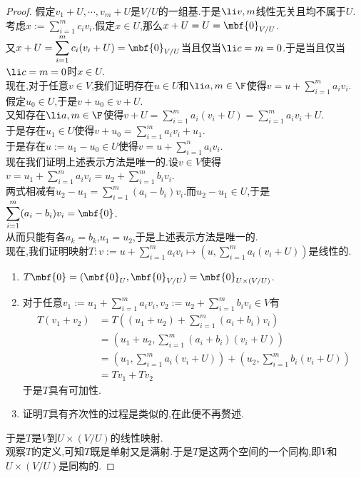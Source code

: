 \documentclass{ctexart}
\begin{document}
\begin{proof}
    假定$v_1+U,\cdots,v_m+U$是$V/U$的一组基.于是$\li v,m$线性无关且均不属于$U$.\\
    考虑$\displaystyle x:=\sum_{i=1}^{m}c_iv_i$.假定$x\in U$,那么$x+U=U=\mbf{0}_{V/U}$.\\
    又$\displaystyle x+U=\sum_{i=1}^{m}c_i(v_i+U)=\mbf{0}_{V/U}$当且仅当$\li c=m=0$.于是当且仅当$\li c=m=0$时$x\in U$.\\
    现在,对于任意$v\in V$,我们证明存在$u\in U$和$\li a,m\in\F$使得$\displaystyle v=u+\sum_{i=1}^{m}a_iv_i$.\\
    假定$u_0\in U$,于是$v+u_0\in v+U$.\\
    又知存在$\li a,m\in\F$使得$\displaystyle v+U=\sum_{i=1}^{m}a_i(v_i+U)=\sum_{i=1}^{m}a_iv_i+U$.\\
    于是存在$u_1\in U$使得$\displaystyle v+u_0=\sum_{i=1}^{m}a_iv_i+u_1$.\\
    于是存在$u:=u_1-u_0\in U$使得$\displaystyle v=u+\sum_{i=1}^{n}a_iv_i$.\\
    现在我们证明上述表示方法是唯一的.设$v\in V$使得$\displaystyle v=u_1+\sum_{i=1}^{m}a_iv_i=u_2+\sum_{i=1}^{m}b_iv_i$.\\
    两式相减有$\displaystyle u_2-u_1=\sum_{i=1}^{m}(a_i-b_i)v_i$.而$u_2-u_1\in U$,于是$\displaystyle\sum_{i=1}^{m}(a_i-b_i)v_i=\mbf{0}$.\\
    从而只能有各$a_k=b_k$,$u_1=u_2$,于是上述表示方法是唯一的.\\
    现在,我们证明映射$\displaystyle T:v:=u+\sum_{i=1}^{m}a_iv_i\mapsto \left(u,\sum_{i=1}^{m}a_i(v_i+U)\right)$是线性的.\\
    \begin{enumerate}[label=\tbf{(\alph*)}]
        \item $T\mbf{0}=(\mbf{0}_U,\mbf{0}_{V/U})=\mbf{0}_{U\times(V/U)}$.
        \item 对于任意$\displaystyle v_1:=u_1+\sum_{i=1}^{m}a_iv_i,v_2:=u_2+\sum_{i=1}^{m}b_iv_i\in V$有
            $$\begin{aligned}
                T(v_1+v_2)
                &= T((u_1+u_2)+\sum_{i=1}^m(a_i+b_i)v_i) \\
                &= \left(u_1+u_2,\sum_{i=1}^{m}(a_i+b_i)(v_i+U)\right) \\
                &= \left(u_1,\sum_{i=1}^{m}a_i(v_i+U)\right)+\left(u_2,\sum_{i=1}^{m}b_i(v_i+U)\right) \\
                &= Tv_1+Tv_2
            \end{aligned}$$
            于是$T$具有可加性.
        \item 证明$T$具有齐次性的过程是类似的,在此便不再赘述.
    \end{enumerate}
    于是$T$是$V$到$U\times(V/U)$的线性映射.\\
    观察$T$的定义,可知$T$既是单射又是满射.于是$T$是这两个空间的一个同构,即$V$和$U\times(V/U)$是同构的.
\end{proof}
\end{document}
